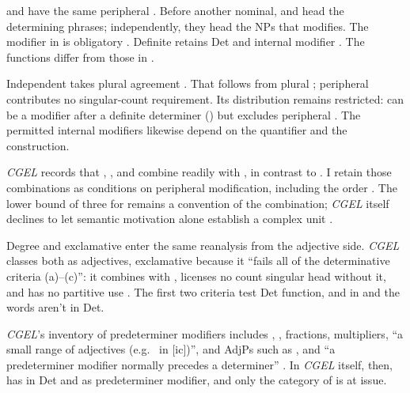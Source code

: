\documentclass[12pt]{article}
\begin{document}
 and  have the same peripheral . Before another nominal,  and  head the determining phrases; independently, they head the NPs that  modifies. The modifier in  is obligatory \citep[394]{huddleston2002}. Definite  retains Det  and internal modifier  \citep[392]{huddleston2002}. The functions differ from those in .

Independent  takes plural agreement \citep[392]{huddleston2002}. That follows from plural ; peripheral  contributes no singular-count requirement. Its distribution remains restricted:  can be a modifier after a definite determiner () \citep[392]{huddleston2002} but excludes peripheral . The permitted internal modifiers likewise depend on the quantifier and the construction.

\textit{CGEL} records that , , and  combine readily with , in contrast to  \citep[392]{huddleston2002}. I retain those combinations as conditions on peripheral modification, including the order . The lower bound of three for  \citep[392]{huddleston2002} remains a convention of the combination; \textit{CGEL} itself declines to let semantic motivation alone establish a complex unit \citep[621]{huddleston2002}.

Degree  and exclamative  enter the same reanalysis from the adjective side. \textit{CGEL} classes both as adjectives, exclamative  because it \enquote{fails all of the determinative criteria (a)--(c)}: it combines with , licenses no count singular head without it, and has no partitive use \citep[539--540]{huddleston2002}. The first two criteria test Det function, and in  and  the words aren't in Det.

\textit{CGEL}'s inventory of predeterminer modifiers includes , , fractions, multipliers, \enquote{a small range of adjectives (e.g.\  in [ic])}, and AdjPs such as , and \enquote{a predeterminer modifier normally precedes a determiner} \citep[331]{huddleston2002}. In \textit{CGEL} itself, then,  has  in Det and  as predeterminer modifier, and only the category of  is at issue.
\end{document}
